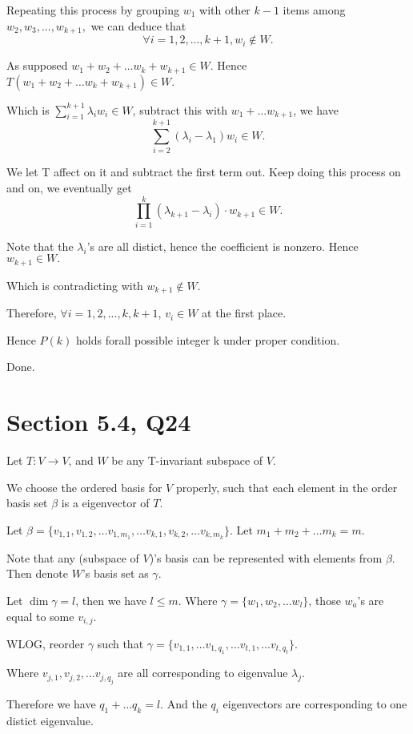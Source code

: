 \documentclass[12pt]{article}%
\begin{document}
Repeating this process by grouping $w_1$ with other $k-1$ items among $w_2,w_3,...,w_{k+1},$ we can deduce that $$\forall i=1,2,...,k+1, w_{i} \notin W.$$

As supposed $w_1+w_2+\dots w_k + w_{k+1} \in W.$ Hence $T(w_1+w_2+\dots w_k + w_{k+1} )\in W.$ 

Which is $\sum_{i=1}^{k+1}\lambda_{i}w_i \in W$, subtract this with $w_1+...w_{k+1}$, we have $$\sum_{i=2}^{k+1}(\lambda_{i}-\lambda_1)w_{i} \in W.$$

We let T affect on it and subtract the first term out. Keep doing this process on and on, we eventually get $$\prod_{i=1}^{k}(\lambda_{k+1}-\lambda_i) \cdot w_{k+1} \in W.$$

Note that the $\lambda_i$'s are all distict, hence the coefficient is nonzero. Hence $w_{k+1} \in W.$

Which is contradicting with $w_{k+1} \notin W.$

Therefore, $\forall i=1,2,...,k,k+1$, $v_i \in W$ at the first place.

Hence $P(k)$ holds forall possible integer k under proper condition.

Done.


\section{Section 5.4, Q24}

Let $T:V\to V$, and $W$ be any T-invariant subspace of $V$. 

We choose the ordered basis for $V$ properly, such that each element in the order basis set $\beta$ is a eigenvector of $T$.

Let $\beta = \{v_{1,1},v_{1,2},\dots v_{1,m_1},\dots v_{k,1},v_{k,2},\dots v_{k,m_k}\}.$ Let $m_1+m_2+\dots m_k =m.$

Note that any (subspace of $V$)'s basis can be represented with elements from $\beta$. Then denote $W$'s basis set as $\gamma$.

Let $\dim \gamma=l$, then we have $l\leq m.$ Where $\gamma = \{w_1,w_2,\dots w_l\}$, those $w_a$'s are equal to some $v_{i,j}.$

WLOG, reorder $\gamma$ such that $\gamma=\{v_{1,1},\dots v_{1,q_1} , \dots v_{t,1},\dots v_{t,q_t}\}$. 

Where $v_{j,1},v_{j,2},\dots v_{j,q_j}$ are all corresponding to eigenvalue $\lambda_j.$ 

Therefore we have $q_1+\dots q_k =l.$ And the $q_i$ eigenvectors are corresponding to one distict eigenvalue.
\end{document}
